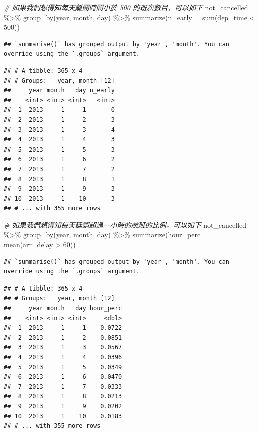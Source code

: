 \documentclass[
]{book}
\newenvironment{Shaded}{\begin{snugshade}}{\end{snugshade}}
\newcommand{\AttributeTok}[1]{\textcolor[rgb]{0.77,0.63,0.00}{#1}}
\newcommand{\CommentTok}[1]{\textcolor[rgb]{0.56,0.35,0.01}{\textit{#1}}}
\newcommand{\DecValTok}[1]{\textcolor[rgb]{0.00,0.00,0.81}{#1}}
\newcommand{\FunctionTok}[1]{\textcolor[rgb]{0.00,0.00,0.00}{#1}}
\newcommand{\NormalTok}[1]{#1}
\newcommand{\SpecialCharTok}[1]{\textcolor[rgb]{0.00,0.00,0.00}{#1}}
\theoremstyle{definition}
\theoremstyle{remark}
\begin{document}
\begin{Shaded}
\begin{Highlighting}[]
\CommentTok{\# 如果我們想得知每天離開時間小於 500 的班次數目，可以如下}
\NormalTok{not\_cancelled }\SpecialCharTok{\%\textgreater{}\%}
  \FunctionTok{group\_by}\NormalTok{(year, month, day) }\SpecialCharTok{\%\textgreater{}\%}
  \FunctionTok{summarize}\NormalTok{(}\AttributeTok{n\_early =} \FunctionTok{sum}\NormalTok{(dep\_time }\SpecialCharTok{\textless{}} \DecValTok{500}\NormalTok{))}
\end{Highlighting}
\end{Shaded}

\begin{verbatim}
## `summarise()` has grouped output by 'year', 'month'. You can override using the `.groups` argument.
\end{verbatim}

\begin{verbatim}
## # A tibble: 365 x 4
## # Groups:   year, month [12]
##     year month   day n_early
##    <int> <int> <int>   <int>
##  1  2013     1     1       0
##  2  2013     1     2       3
##  3  2013     1     3       4
##  4  2013     1     4       3
##  5  2013     1     5       3
##  6  2013     1     6       2
##  7  2013     1     7       2
##  8  2013     1     8       1
##  9  2013     1     9       3
## 10  2013     1    10       3
## # ... with 355 more rows
\end{verbatim}

\begin{Shaded}
\begin{Highlighting}[]
\CommentTok{\# 如果我們想得知每天延誤超過一小時的航班的比例，可以如下}
\NormalTok{not\_cancelled }\SpecialCharTok{\%\textgreater{}\%}
  \FunctionTok{group\_by}\NormalTok{(year, month, day) }\SpecialCharTok{\%\textgreater{}\%}
  \FunctionTok{summarize}\NormalTok{(}\AttributeTok{hour\_perc =} \FunctionTok{mean}\NormalTok{(arr\_delay }\SpecialCharTok{\textgreater{}} \DecValTok{60}\NormalTok{))}
\end{Highlighting}
\end{Shaded}

\begin{verbatim}
## `summarise()` has grouped output by 'year', 'month'. You can override using the `.groups` argument.
\end{verbatim}

\begin{verbatim}
## # A tibble: 365 x 4
## # Groups:   year, month [12]
##     year month   day hour_perc
##    <int> <int> <int>     <dbl>
##  1  2013     1     1    0.0722
##  2  2013     1     2    0.0851
##  3  2013     1     3    0.0567
##  4  2013     1     4    0.0396
##  5  2013     1     5    0.0349
##  6  2013     1     6    0.0470
##  7  2013     1     7    0.0333
##  8  2013     1     8    0.0213
##  9  2013     1     9    0.0202
## 10  2013     1    10    0.0183
## # ... with 355 more rows
\end{verbatim}
\end{document}
